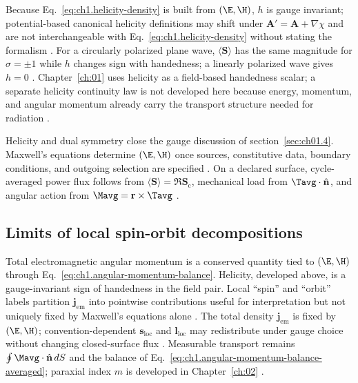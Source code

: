 Because Eq.~\eqref{eq:ch1.helicity-density} is built from $(\E,\H)$, $h$ is gauge invariant; potential-based canonical helicity definitions may shift under $\mathbf{A}'=\mathbf{A}+\nabla\chi$ and are not interchangeable with Eq.~\eqref{eq:ch1.helicity-density} without stating the formalism \cite{belinfante1940,tai1994,jackson1999}. For a circularly polarized plane wave, $\langle\mathbf{S}\rangle$ has the same magnitude for $\sigma=\pm1$ while $h$ changes sign with handedness; a linearly polarized wave gives $h=0$ \cite{stratton1941}. Chapter~\ref{ch:01} uses helicity as a field-based handedness scalar; a separate helicity continuity law is not developed here because energy, momentum, and angular momentum already carry the transport structure needed for radiation \cite{stratton1941}.

Helicity and dual symmetry close the gauge discussion of section~\ref{sec:ch01.4}. Maxwell's equations determine $(\E,\H)$ once sources, constitutive data, boundary conditions, and outgoing selection are specified \cite{maxwell1873,stratton1941}. On a declared surface, cycle-averaged power flux follows from $\langle\mathbf{S}\rangle=\Re\mathbf{S}_\mathrm{c}$, mechanical load from $\Tavg\cdot\hat{\mathbf{n}}$, and angular action from $\Mavg=\mathbf{r}\times\Tavg$ \cite{poynting1884,beth1936}.

\label{sec:ch01.4.4}
\subsection{Limits of local spin-orbit decompositions}
\label{sec:ch01.4.5}

Total electromagnetic angular momentum is a conserved quantity tied to $(\E,\H)$ through Eq.~\eqref{eq:ch1.angular-momentum-balance}. Helicity, developed above, is a gauge-invariant sign of handedness in the field pair. Local ``spin'' and ``orbit'' labels partition $\mathbf{j}_{\mathrm{em}}$ into pointwise contributions useful for interpretation but not uniquely fixed by Maxwell's equations alone \cite{belinfante1940,stratton1941}. The total density $\mathbf{j}_{\mathrm{em}}$ is fixed by $(\E,\H)$; convention-dependent $\mathbf{s}_{\mathrm{loc}}$ and $\mathbf{l}_{\mathrm{loc}}$ may redistribute under gauge choice without changing closed-surface flux \cite{belinfante1940,stratton1941}. Measurable transport remains $\oint \Mavg\cdot\hat{\mathbf{n}}\,dS$ and the balance of Eq.~\eqref{eq:ch1.angular-momentum-balance-averaged}; paraxial index $m$ is developed in Chapter~\ref{ch:02} \cite{allen1992}.

